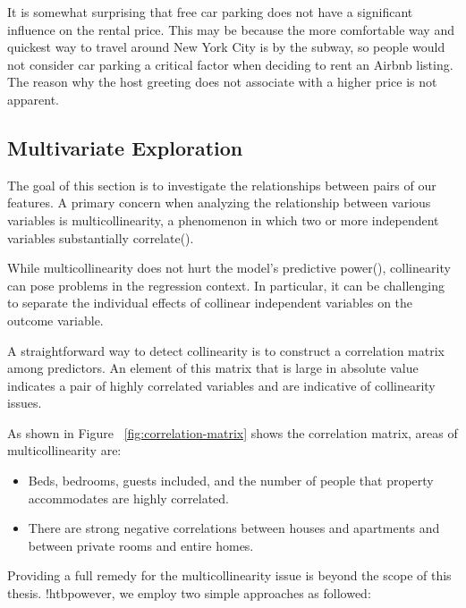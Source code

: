 It is somewhat surprising that free car parking does not have a significant
influence on the rental price. This may be because the more comfortable way and
quickest way to travel around New York City is by the subway, so people would
not consider car parking a critical factor when deciding to rent an Airbnb
listing. The reason why the host greeting does not associate with a higher price
is not apparent.

\subsection{Multivariate Exploration}
\label{sec:multivariate-exploration}

The goal of this section is to investigate the relationships between pairs of
our features. A primary concern when analyzing the relationship between various
variables is multicollinearity, a phenomenon in which two or more independent
variables substantially correlate(\textcite{cohen2013applied}).

While multicollinearity does not hurt the model's predictive
power(\textcite{kutner2005applied}), collinearity can pose problems in the
regression context. In particular,  it can be challenging to separate the
individual effects of collinear independent variables on the outcome variable.

A straightforward way to detect collinearity is to construct a correlation
matrix among predictors.  An element of this matrix that is large in absolute
value indicates a pair of highly correlated variables and are indicative of
collinearity issues.


As shown in Figure ~\ref{fig:correlation-matrix} shows the correlation matrix,
areas of multicollinearity are:
\begin{itemize}
    \item Beds, bedrooms, guests included, and the number of people that
      property accommodates are highly correlated.
    \item There are strong negative correlations between houses and apartments
        and between private rooms and entire homes.
\end{itemize}

Providing a full remedy for the multicollinearity issue is beyond the scope of
this thesis. !htbpowever, we employ two  simple approaches as followed:

